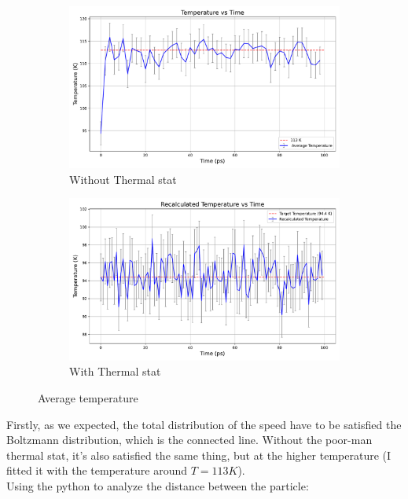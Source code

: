 \documentclass[a4paper]{article}
\begin{document}
\begin{figure}[h]
	\centering
	\captionsetup{justification=centering}
	\hfill
	\begin{subfigure}{0.4\linewidth}
		\includegraphics[width=\textwidth]{Images/tempnopm.pdf}
		\caption{Without Thermal stat}
		\label{tempnopm}
	\end{subfigure}
	\hfill
	\begin{subfigure}{0.4\linewidth}
		\includegraphics[width=\textwidth]{Images/temppmtr=2.pdf}
		\caption{With Thermal stat}
		\label{temppm}
	\end{subfigure}
	\caption{Average temperature}
	\label{fig:Temp}
\end{figure}
Firstly, as we expected, the total distribution of the speed have to be satisfied the Boltzmann distribution, which is the connected line. Without the poor-man thermal stat, it's also satisfied the same thing, but at the higher temperature (I fitted it with the temperature around \(T = 113 K\)).\\\null
Using the python to analyze the distance between the particle:
\end{document}
